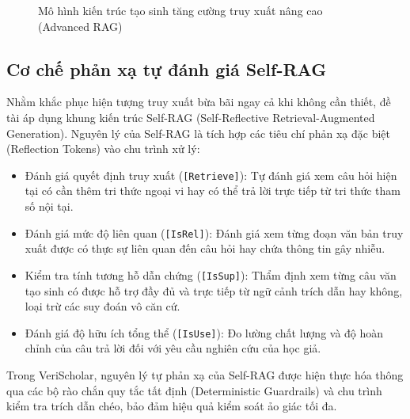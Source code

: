 \begin{figure}[!htbp]
\caption{Mô hình kiến trúc tạo sinh tăng cường truy xuất nâng cao (Advanced RAG)}
\label{fig:advanced_rag}
\end{figure}

\subsection{Cơ chế phản xạ tự đánh giá Self-RAG}
\label{subsec:self_rag}
Nhằm khắc phục hiện tượng truy xuất bừa bãi ngay cả khi không cần thiết, đề tài áp dụng khung kiến trúc Self-RAG (Self-Reflective Retrieval-Augmented Generation). Nguyên lý của Self-RAG là tích hợp các tiêu chí phản xạ đặc biệt (Reflection Tokens) vào chu trình xử lý:
\begin{itemize}
    \item Đánh giá quyết định truy xuất (\texttt{[Retrieve]}): Tự đánh giá xem câu hỏi hiện tại có cần thêm tri thức ngoại vi hay có thể trả lời trực tiếp từ tri thức tham số nội tại.
    \item Đánh giá mức độ liên quan (\texttt{[IsRel]}): Đánh giá xem từng đoạn văn bản truy xuất được có thực sự liên quan đến câu hỏi hay chứa thông tin gây nhiễu.
    \item Kiểm tra tính tương hỗ dẫn chứng (\texttt{[IsSup]}): Thẩm định xem từng câu văn tạo sinh có được hỗ trợ đầy đủ và trực tiếp từ ngữ cảnh trích dẫn hay không, loại trừ các suy đoán vô căn cứ.
    \item Đánh giá độ hữu ích tổng thể (\texttt{[IsUse]}): Đo lường chất lượng và độ hoàn chỉnh của câu trả lời đối với yêu cầu nghiên cứu của học giả.
\end{itemize}
Trong VeriScholar, nguyên lý tự phản xạ của Self-RAG được hiện thực hóa thông qua các bộ rào chắn quy tắc tất định (Deterministic Guardrails) và chu trình kiểm tra trích dẫn chéo, bảo đảm hiệu quả kiểm soát ảo giác tối đa.

